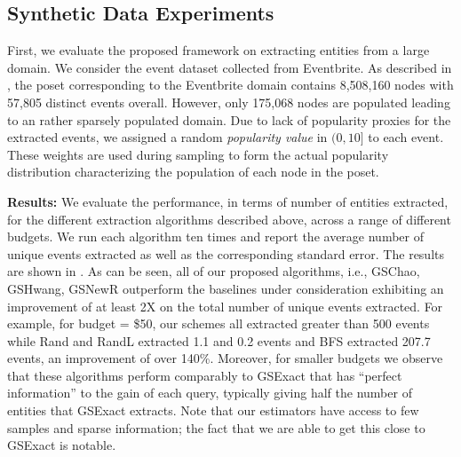 \subsection{Synthetic Data Experiments}
\label{sec:synthetic}
First, we evaluate the proposed framework on extracting entities from a large domain. We consider the event dataset collected from Eventbrite. As described in , the poset corresponding to the Eventbrite domain contains 8,508,160 nodes with 57,805 distinct events overall. However, only 175,068 nodes are populated leading to an rather sparsely populated domain. Due to lack of popularity proxies for the extracted events, we assigned a random {\em popularity value} in $(0,10]$ to each event. These weights are used during sampling to form the actual popularity distribution characterizing the population of each node in the poset. 

\noindent\textbf{Results:}  We evaluate the performance, in terms of number of entities extracted, for the different extraction algorithms described above, across a range of different budgets. We run each algorithm ten times and report the average number of unique events extracted as well as the corresponding standard error. The results are shown in . As can be seen, all of our proposed algorithms, i.e., GSChao, GSHwang, GSNewR outperform the baselines under consideration exhibiting an improvement of at least 2X on the total number of unique events extracted. For example, for budget = \$50, our schemes all extracted greater than 500 events while Rand and RandL extracted 1.1 and 0.2 events and BFS extracted 207.7 events, an improvement of over 140\%. Moreover, for smaller budgets we observe that these algorithms perform comparably to GSExact that has ``perfect information'' to the gain of each query, typically giving half the number of entities that GSExact extracts. Note that our estimators have access to few samples and sparse information; the fact that we are able to get this close to GSExact is notable.

